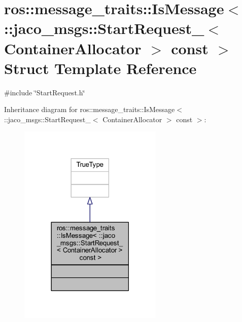 \hypertarget{structros_1_1message__traits_1_1IsMessage_3_01_1_1jaco__msgs_1_1StartRequest___3_01ContainerAllocator_01_4_01const_01_01_4}{}\section{ros\+:\+:message\+\_\+traits\+:\+:Is\+Message$<$ \+:\+:jaco\+\_\+msgs\+:\+:Start\+Request\+\_\+$<$ Container\+Allocator $>$ const $>$ Struct Template Reference}
\label{structros_1_1message__traits_1_1IsMessage_3_01_1_1jaco__msgs_1_1StartRequest___3_01ContainerAllocator_01_4_01const_01_01_4}


{\ttfamily \#include \char`\"{}Start\+Request.\+h\char`\"{}}



Inheritance diagram for ros\+:\+:message\+\_\+traits\+:\+:Is\+Message$<$ \+:\+:jaco\+\_\+msgs\+:\+:Start\+Request\+\_\+$<$ Container\+Allocator $>$ const $>$\+:
\nopagebreak
\begin{figure}[H]
\begin{center}
\leavevmode
\includegraphics[width=194pt]{d9/d77/structros_1_1message__traits_1_1IsMessage_3_01_1_1jaco__msgs_1_1StartRequest___3_01ContainerAllo0273fb48eb0d0f373458e42bd775ee81}
\end{center}
\end{figure}


